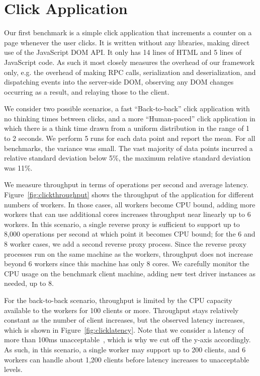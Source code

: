 %
%

\section{Click Application}
Our first benchmark is a simple click application that increments a counter on a page
whenever the user clicks.  It is written without any libraries, making direct use of
the JavaScript DOM API.  It only has 14 lines of HTML and 5 lines of JavaScript code.
As such it most closely measures the overhead of our
framework only, e.g. the overhead of making RPC calls, serialization and deserialization,
and dispatching events into the server-side DOM, observing any DOM changes occurring as
a result, and relaying those to the client.

We consider two possible scenarios, a fast ``Back-to-back'' click application 
with no thinking times between clicks, and a more ``Human-paced'' click application
in which there is a think time drawn from a uniform distribution in the range of
1 to 2 seconds.  We perform 5 runs for each data point and report the mean.
For all benchmarks, the variance was small. The vast majority of data points incurred
a relative standard deviation below 5\%, the maximum relative standard deviation was 11\%.

\clickthroughput{}
\clicklatency{}

We measure throughput in terms of operations per second and average latency.  
Figure~\ref{fig:clickthroughput} shows the throughput of the application for different
numbers of workers. In those cases, all workers become CPU bound, adding more workers
that can use additional cores increases throughput near linearly up to 6 workers. 
In this scenario, a single reverse proxy is sufficient to support up to
8,000 operations per second at which point it becomes CPU bound;
for the 6 and 8 worker cases, we add a second reverse proxy process.
Since the reverse proxy processes run on the same machine as the workers, throughput 
does not increase beyond 6 workers since this machine has only 8 cores.
We carefully monitor the CPU usage on the benchmark client machine, adding new
test driver instances as needed, up to 8.

\clickwaitthroughput{}
\clickwaitlatency{}

For the back-to-back scenario, throughput is limited by the CPU capacity available
to the workers for 100 clients or more.  Throughput stays relatively constant as
the number of client increases, but the observed latency increases, which is
shown in Figure~\ref{fig:clicklatency}.  Note that we consider a latency of more than
100ms unacceptable~\cite{Nielsen1993Usability}, which is why we cut off the y-axis
accordingly.  As such, in this scenario, a single worker may support up to 200 clients,
and 6 workers can handle about 1,200 clients before latency increases to unacceptable
levels. 

